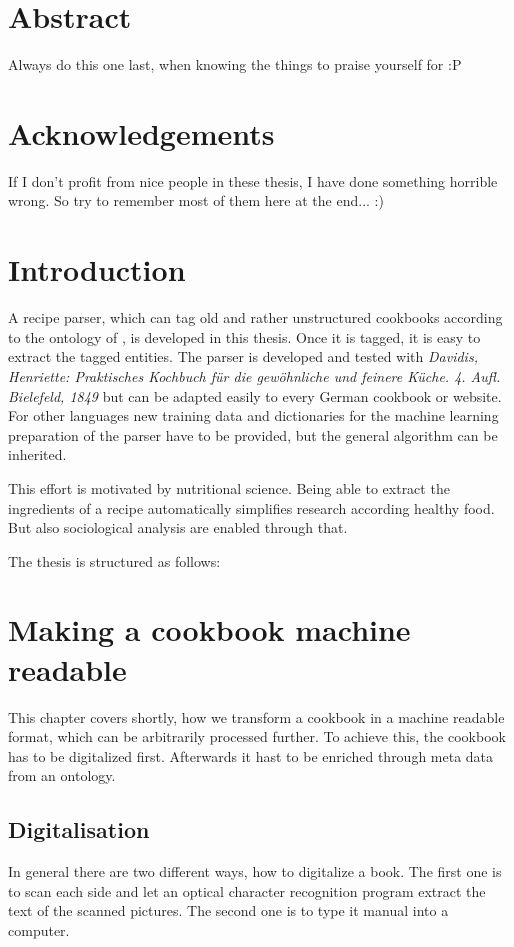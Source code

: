 \documentclass[12pt, twoside]{report}
\begin{document}
\chapter*{Abstract}
Always do this one last, when knowing the things to praise  yourself for :P

\chapter*{Acknowledgements}
If I don't profit from nice people in these thesis, I have done something horrible wrong. So try to remember most of them here at the end... :)

\tableofcontents

\listoffigures
\begingroup
	\let\clearpage\relax
	\listoftables
\endgroup

\clearpage
{}  
\chapter{Introduction}
A recipe parser, which can tag old and rather unstructured cookbooks according to the ontology of \parencite{schemaOrg}, is developed in this thesis. Once it is tagged, it is easy to extract the tagged entities. The parser is developed and tested with \textit{Davidis, Henriette: Praktisches Kochbuch für die gewöhnliche und feinere Küche. 4. Aufl. Bielefeld, 1849} but can be adapted easily to every German cookbook or website. For other languages new training data and dictionaries for the machine learning preparation of the parser have to be provided, but the general algorithm can be inherited.

This effort is motivated by nutritional science. Being able to extract the ingredients of a recipe automatically simplifies research according healthy food. But also sociological analysis are enabled through that.

The thesis is structured as follows:


\chapter{Making a cookbook machine readable}
This chapter covers shortly, how we transform a cookbook in a machine readable format, which can be arbitrarily processed further. To achieve this, the cookbook has to be digitalized first. Afterwards it hast to be enriched through meta data from an ontology.

\section{Digitalisation}
In general there are two different ways, how to digitalize a book. The first one is to scan each side and let an optical character recognition program extract the text of the scanned pictures. The second one is to type it manual into a computer.
\end{document}
